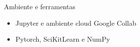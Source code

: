 \documentclass{beamer}
\begin{document}
\begin{frame}{Ambiente e ferramentas}
    \begin{itemize}
        \item Jupyter e ambiente cloud Google Collab
        \item Pytorch, SciKitLearn e NumPy
    \end{itemize}




\end{frame}
\end{document}
